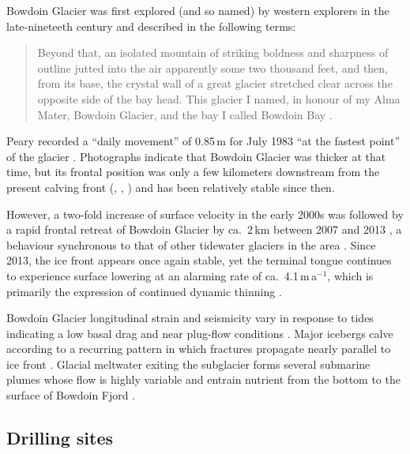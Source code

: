 \documentclass[utf8]{article}
\begin{document}
    Bowdoin Glacier was first explored (and so named) by western explorers in
    the late-nineteeth century and described in the following terms:
    \begin{quote}
        Beyond that, an isolated mountain of striking boldness and sharpness of
        outline jutted into the air apparently some two thousand feet, and
        then, from its base, the crystal wall of a great glacier stretched
        clear across the opposite side of the bay head. This glacier I named,
        in honour of my Alma Mater, Bowdoin Glacier, and the bay I called
        Bowdoin Bay \citep[p.~393--394)]{Peary.1898}.
    \end{quote}
    Peary recorded a ``daily movement'' of 0.85\,m for July 1983 ``at the
    fastest point'' of the glacier \citep{Chamberlin.1894}.
    Photographs indicate that Bowdoin Glacier was thicker at that time, but its
    frontal position was only a few kilometers downstream from the present
    calving front (\citealp[p.~668]{Chamberlin.1895}, \citealp[Figs.~64
    and~65]{Chamberlin.1897}, \citealp[Fig.~1]{Podolskiy.etal.2016}) and has
    been relatively stable since then.

    However, a two-fold increase of surface velocity in the early 2000s was
    followed by a rapid frontal retreat of Bowdoin Glacier by ca.~2\,km between
    2007 and 2013 \citep[Fig.~2]{Sugiyama.etal.2015}, a behaviour synchronous
    to that of other tidewater glaciers in the area
    \citep{Sakakibara.Sugiyama.2018}. Since 2013, the ice front appears once
    again stable, yet the terminal tongue continues to experience surface
    lowering at an alarming rate of ca.~4.1\,m\,a$^{-1}$, which is primarily
    the expression of continued dynamic thinning \citep{Tsutaki.etal.2016}.

    Bowdoin Glacier longitudinal strain and seismicity vary in response to
    tides~\citep{Podolskiy.etal.2016, Podolskiy.etal.2017} indicating a low
    basal drag and near plug-flow conditions \citep{Seddik.etal.2019}. Major
    icebergs calve according to a recurring pattern in which fractures
    propagate nearly parallel to ice front \citep{Jouvet.etal.2017}. Glacial
    meltwater exiting the subglacier forms several submarine plumes whose flow
    is highly variable \citep{Jouvet.etal.2018} and entrain nutrient from the
    bottom to the surface of Bowdoin Fjord \citep{Kanna.etal.2018}.


\subsection{Drilling sites}
\end{document}
